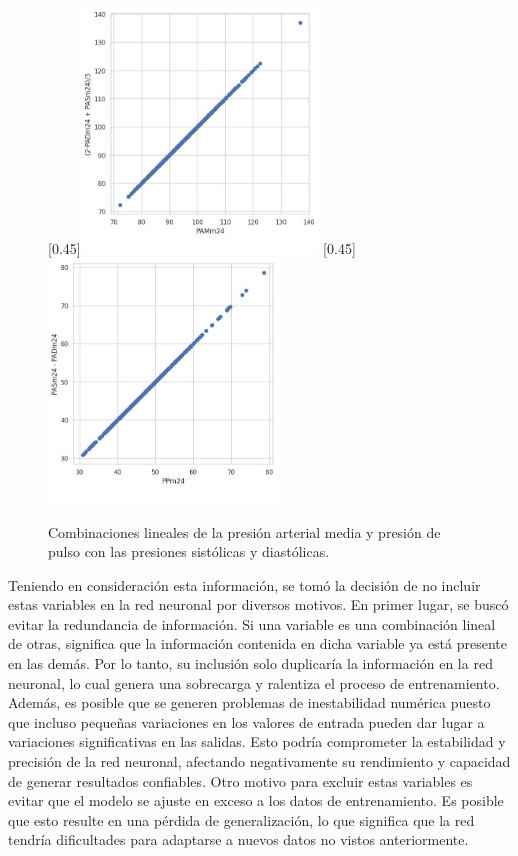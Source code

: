 \begin{figure}[H]
	\centering
	\hspace{1em}
	[0.45\linewidth]{\includegraphics[height=6.5cm]{./Figures/PAM.jpg}}
	\hspace{1em}
	[0.45\linewidth]{\includegraphics[height=6.5cm]{./Figures/PP.jpg}}
	\caption{Combinaciones lineales de la presión arterial media y presión de pulso con las presiones sistólicas y diastólicas.}\label{fig:pamypp}
\end{figure}


Teniendo en consideración esta información, se tomó la decisión de no incluir estas variables en 
la red neuronal por diversos motivos. En primer lugar, se buscó evitar la redundancia de información. 
Si una variable es una combinación lineal de otras, significa que la información contenida en 
dicha variable ya está presente en las demás. Por lo tanto, su inclusión solo duplicaría la 
información en la red neuronal, lo cual genera una sobrecarga y ralentiza el proceso de 
entrenamiento. Además, es posible que se generen problemas de inestabilidad numérica puesto que incluso 
pequeñas variaciones en los valores de entrada pueden dar lugar a variaciones significativas 
en las salidas. Esto podría comprometer la estabilidad y precisión de la red neuronal, afectando 
negativamente su rendimiento y capacidad de generar resultados confiables. Otro motivo para 
excluir estas variables es evitar que el modelo se ajuste en exceso a los datos de entrenamiento. 
Es posible que esto resulte en una pérdida de generalización, lo que significa que la red tendría 
dificultades para adaptarse a nuevos datos no vistos anteriormente.

